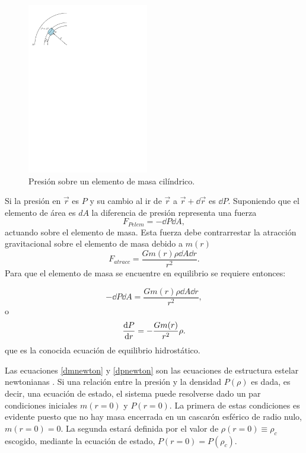 \begin{figure}[H]
    \centering
    \includegraphics[width=150pt]{figures/stellarnewton.pdf}
    \caption{Presión sobre un elemento de masa cilíndrico.}
    \label{stellnew}
\end{figure}
Si la presión en $\vec{r}$ es $P$ y su cambio al ir de $\vec{r}$ a $\vec{r}+\dd{\vec{r}}$ es $\dd{P}$. Suponiendo que el elemento de área es $dA$ la diferencia de presión representa una fuerza 
\begin{equation*}
    F_{Pelem}=-\dd{P}\dd{A},
\end{equation*}
actuando sobre el elemento de masa. Esta fuerza debe contrarrestar la atracción gravitacional sobre el elemento de masa debido a $m(r)$
\begin{equation*}
    F_{atracc}=\frac{G m(r)\rho \dd{A} \dd{r}}{r^2}.
\end{equation*}
Para que el elemento de masa se encuentre en equilibrio se requiere entonces:

\begin{equation}
    -\dd{P}\dd{A} =\frac{G m(r)\rho \dd{A} \dd{r}}{r^2},
\end{equation}
o
\begin{equation}
    \dv{P}{r} = - \frac { G m ( r ) } { r ^ { 2 } } \rho.
    \label{dpnewton}
\end{equation}
que es la conocida ecuación de equilibrio hidrostático. 

Las ecuaciones \eqref{dmnewton} y \eqref{dpnewton} son las ecuaciones de estructura estelar newtonianas \cite{Chandrasekhar1958}. Si una relación entre la presión y la densidad $P(\rho)$ es dada, es decir, una ecuación de estado, el sistema puede resolverse dado un par condiciones iniciales $m(r=0)$ y $P(r=0)$. La primera de estas condiciones es evidente puesto que no hay masa encerrada en un cascarón esférico de radio nulo, $m(r=0)=0$. La segunda estará definida por el valor de $\rho(r=0)\equiv\rho_c$ escogido, mediante la ecuación de estado, $P(r=0)=P(\rho_c)$.

